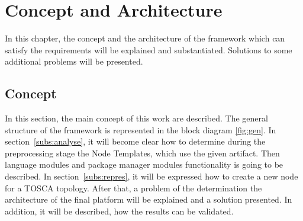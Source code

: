 
\chapter{Concept and Architecture}\label{chap:conarch}
In this chapter, the concept and the architecture of the framework which can satisfy the requirements will be explained and substantiated.
Solutions to some additional problems will be presented. 
\section{Concept}
In this section, the main concept of this work are described.
The general structure of the framework is represented in the block diagram \ref{fig:gen}. 
In section~\ref{subs:analyse}, it will become clear how to determine during the preprocessing stage the Node Templates, which use the given artifact.
Then language modules and package manager modules functionality is going to be described.
In section~\ref{subs:repres}, it will be expressed how to create a new node for a TOSCA topology. 
After that, a problem of the determination the architecture of the final platform will be explained and a solution presented.
In addition, it will be described, how the results can be validated.



